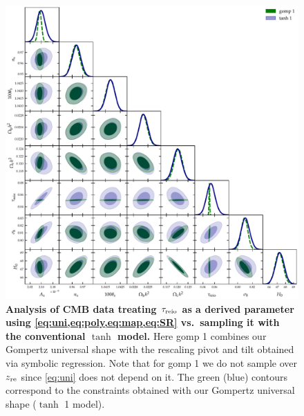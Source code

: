 \begin{figure}[tb]
\centering
\includegraphics[width=\linewidth]{figs/gomp_tanh_triangle_kill_full.pdf}
\caption{\textbf{Analysis of CMB data treating $\tau_{\mathrm{reio}}$ as a derived
parameter using \cref{eq:uni,eq:poly,eq:map,eq:SR} vs.\ sampling it with
the conventional $\tanh$ model.} Here gomp 1 combines our Gompertz universal
shape with the rescaling pivot and tilt obtained via symbolic regression. Note that for
gomp 1 we do not sample over $z_{\mathrm{re}}$ since \cref{eq:uni} does not depend on it.
The green (blue) contours correspond to the constraints obtained with
our Gompertz universal shape ($\tanh$ 1 model).}
\label{fig:unleashed_gomp}
\end{figure}


